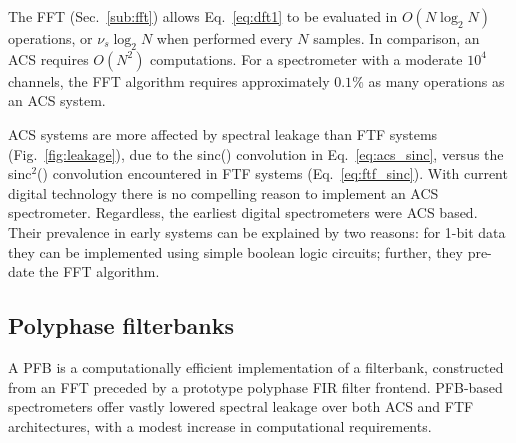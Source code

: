 \documentclass{ws-rv961x669}
\begin{document}
The FFT (Sec.~\ref{sub:fft}) allows Eq.~\ref{eq:dft1} to be evaluated in $O(N\log_2N)$ operations, or $\nu_s\log_2N$ when performed every $N$ samples. In comparison, an ACS requires $O(N^2)$ computations. For a spectrometer with a moderate $10^4$ channels, the FFT algorithm requires approximately $0.1\%$ as many operations as an ACS system.
 
ACS systems are more affected by spectral leakage than FTF systems (Fig.~\ref{fig:leakage}), due to the sinc() convolution in Eq.~\ref{eq:acs_sinc}, versus the sinc$^2$() convolution encountered in FTF systems (Eq.~\ref{eq:ftf_sinc}). With current digital technology there is no compelling reason to implement an ACS spectrometer. Regardless, the earliest digital spectrometers were ACS based. Their prevalence in early systems can be explained by two reasons: for 1-bit data they can be implemented using simple boolean logic circuits; further, they pre-date the FFT algorithm.  
 
\subsection{Polyphase filterbanks}\label{sub:pfb}

A PFB is a computationally efficient implementation of a filterbank, constructed from an FFT preceded by a prototype polyphase FIR filter frontend.\citet{Schafer1973, Bellanger:1976p7898,  Harris2011} PFB-based spectrometers offer vastly lowered spectral leakage over both ACS and FTF architectures, with a modest increase in computational requirements.
\end{document}
